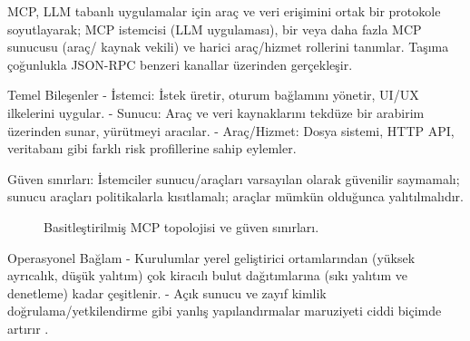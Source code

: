 MCP, LLM tabanlı uygulamalar için araç ve veri erişimini ortak bir protokole soyutlayarak; MCP istemcisi (LLM uygulaması), bir veya daha fazla MCP sunucusu (araç/ kaynak vekili) ve harici araç/hizmet rollerini tanımlar. Taşıma çoğunlukla JSON-RPC benzeri kanallar üzerinden gerçekleşir.

Temel Bileşenler
- İstemci: İstek üretir, oturum bağlamını yönetir, UI/UX ilkelerini uygular.
- Sunucu: Araç ve veri kaynaklarını tekdüze bir arabirim üzerinden sunar, yürütmeyi aracılar.
- Araç/Hizmet: Dosya sistemi, HTTP API, veritabanı gibi farklı risk profillerine sahip eylemler.

Güven sınırları: İstemciler sunucu/araçları varsayılan olarak güvenilir saymamalı; sunucu araçları politikalarla kısıtlamalı; araçlar mümkün olduğunca yalıtılmalıdır.

\begin{figure}[h]
\centering
{}
\caption{Basitleştirilmiş MCP topolojisi ve güven sınırları.}
\label{fig:mcp-arch}
\end{figure}

Operasyonel Bağlam
- Kurulumlar yerel geliştirici ortamlarından (yüksek ayrıcalık, düşük yalıtım) çok kiracılı bulut dağıtımlarına (sıkı yalıtım ve denetleme) kadar çeşitlenir.
- Açık sunucu ve zayıf kimlik doğrulama/yetkilendirme gibi yanlış yapılandırmalar maruziyeti ciddi biçimde artırır \cite{MDPIElectronics3267}.

